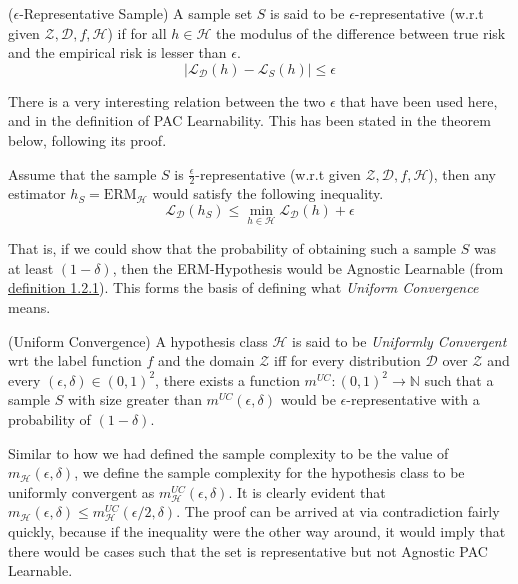 \documentclass[11pt,oneside,onemany]{book} %
\begin{document}
\begin{definition}
($\epsilon$-Representative Sample) A sample set $S$ is said to be $\epsilon$-representative (w.r.t given $\mathcal{Z}, \mathcal{D}, f, \mathcal{H}$) if for all $h \in \mathcal{H}$ the modulus of the difference between true risk and the empirical risk is lesser than $\epsilon$.
$$
  \left| \mathcal{L}_{\mathcal{D}}(h) - \mathcal{L}_S(h) \right| \leq \epsilon
$$
\end{definition}

There is a very interesting relation between the two $\epsilon$ that have been used here, and in the definition of PAC Learnability. This has been stated in the theorem below, following its proof.\\

\begin{theorem}
Assume that the sample $S$ is $\frac{\epsilon}{2}$-representative (w.r.t given $\mathcal{Z}, \mathcal{D}, f, \mathcal{H}$), then any estimator $h_S = \text{ERM}_\mathcal{H}$ would satisfy the following inequality.
$$
    \mathcal{L}_\mathcal{D}(h_S) \leq \min\limits_{h\in\mathcal{H}}\mathcal{L}_\mathcal{D}(h) + \epsilon
$$
\end{theorem}

That is, if we could show that the probability of obtaining such a sample $S$ was at least $(1-\delta)$, then the ERM-Hypothesis would be Agnostic Learnable (from \hyperref[def:agn-PAC]{definition 1.2.1}). This forms the basis of defining what \emph{Uniform Convergence} means.

\begin{definition}
\label{def:uc}
(Uniform Convergence) A hypothesis class $\mathcal{H}$ is said to be \emph{Uniformly Convergent} wrt the label function $f$ and the domain $\mathcal{Z}$ iff for every distribution $\mathcal{D}$ over $\mathcal{Z}$ and every $(\epsilon,\delta)\in(0,1)^2$, there exists a function $m^{UC}:(0,1)^2\rightarrow\mathbb{N}$ such that a sample $S$ with size greater than $m^{UC}(\epsilon,\delta)$ would be $\epsilon$-representative with a probability of $(1-\delta)$.
\end{definition}

Similar to how we had defined the sample complexity to be the value of $m_\mathcal{H}(\epsilon,\delta)$, we define the sample complexity for the hypothesis class to be uniformly convergent as $m_\mathcal{H}^{UC}(\epsilon,\delta)$. It is clearly evident that $m_\mathcal{H}(\epsilon,\delta) \leq m_\mathcal{H}^{UC}(\epsilon/2,\delta)$. The proof can be arrived at via contradiction fairly quickly, because if the inequality were the other way around, it would imply that there would be cases such that the set is representative but not Agnostic PAC Learnable.
\end{document}
